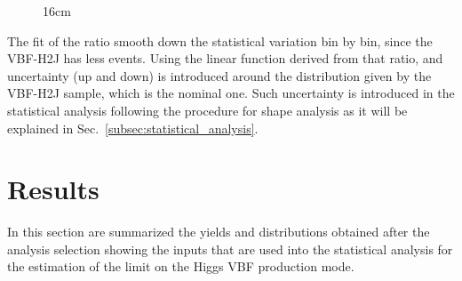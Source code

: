 \begin{figure}[hbtp]{16cm}
	\label{fig:systematic_3rd_jet}
\end{figure}

The fit of the ratio smooth down the statistical variation bin by bin, since the VBF-H2J has less events. Using the linear function derived from that ratio, and uncertainty (up and down) is introduced around the distribution given by the VBF-H2J sample, which is the nominal one. Such uncertainty is introduced in the statistical analysis following the procedure for shape analysis as it will be explained in Sec.~\ref{subsec:statistical_analysis}.

\chapter{Results}
In this section are summarized the yields and distributions obtained after the analysis selection showing the inputs that are used into the statistical analysis for the estimation of the limit on the Higgs VBF production mode. 

